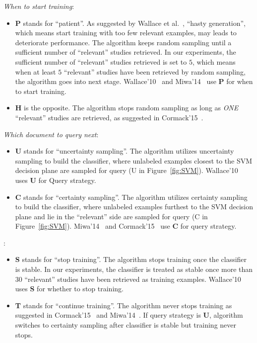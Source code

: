 \documentclass{svjour3}
\theoremstyle{break}
\begin{document}
\vspace{3mm}
\noindent
{\em When to start training}: 
\begin{itemize}
\item \textbf{P} stands for ``patient''. As suggested by Wallace et al.~\cite{wallace2010semi}, ``hasty generation'', which means start training with too few relevant examples, may leads to deteriorate performance. The algorithm keeps random sampling until a sufficient number of ``relevant'' studies retrieved. In our experiments, the sufficient number of ``relevant'' studies retrieved is set to $5$, which means when at least $5$ ``relevant'' studies have been retrieved by random sampling, the algorithm goes into next stage. Wallace'10~\cite{wallace2010semi} and Miwa'14~\cite{miwa2014reducing} use \textbf{P} for when to start training.
\item
\textbf{H} is the opposite. The algorithm stops random sampling as long as {\em ONE} ``relevant'' studies are retrieved, as suggested in Cormack'15~\cite{cormack2014evaluation,cormack2015autonomy}.
\end{itemize}
{\em Which document to query next}: 
\begin{itemize}
\item
\textbf{U} stands for ``uncertainty sampling''. The algorithm utilizes uncertainty sampling to build the classifier, where unlabeled examples closest to the SVM decision plane are sampled for query (U in Figure~\ref{fig:SVM}). Wallace'10~\cite{wallace2010semi} uses \textbf{U} for Query strategy.
\item
\textbf{C} stands for ``certainty sampling''. The algorithm utilizes certainty sampling to build the classifier, where unlabeled examples furthest to the SVM decision plane and lie in the ``relevant'' side are sampled for query (C in Figure~\ref{fig:SVM}). Miwa'14~\cite{miwa2014reducing} and Cormack'15~\cite{cormack2014evaluation,cormack2015autonomy} use \textbf{C} for query strategy.
\end{itemize}
: 
\begin{itemize}
\item
\textbf{S} stands for ``stop training''. The algorithm stops training
once the classifier is stable. In our experiments, the classifier is treated as stable once more than $30$ ``relevant'' studies have been retrieved as training examples. Wallace'10~\cite{wallace2010semi} uses \textbf{S} for whether to stop training.
\item
\textbf{T} stands for ``continue training''. The algorithm never stops
training as suggested in Cormack'15~\cite{cormack2015autonomy} and Miwa'14~\cite{miwa2014reducing}. If query strategy is \textbf{U}, algorithm switches to certainty sampling after classifier is stable but training never stops.
\end{itemize}
\end{document}
